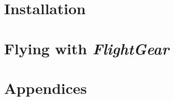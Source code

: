 \documentclass[11pt,a4paper]{book}
\newcommand{\FlightGear}{{\itshape\bfseries FlightGear}}
\begin{document}


\part{Installation}



\part{Flying with \FlightGear{}}


\part{Appendices}
\begin{appendix}



\end{appendix}


\end{document}
